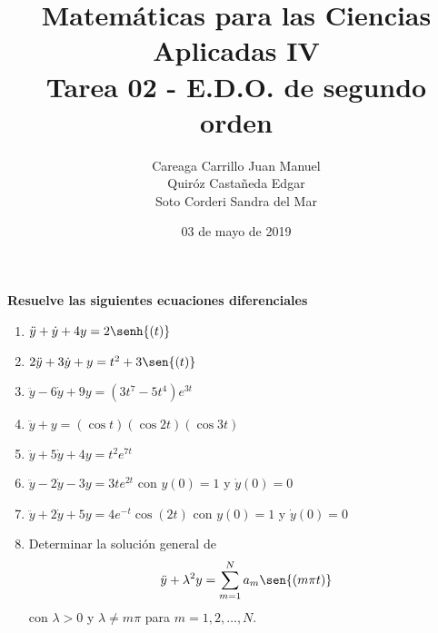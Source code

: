 \documentclass{article}
\title{
    Matemáticas para las Ciencias Aplicadas IV\\
    Tarea 02 - E.D.O. de segundo orden
}
\author{
    Careaga Carrillo Juan Manuel \\
    Quiróz Castañeda Edgar \\
    Soto Corderi Sandra del Mar
}
\date{
    03 de mayo de 2019
}
\begin{document}
    \maketitle
    {\bf Resuelve las siguientes ecuaciones diferenciales}
    \begin{enumerate}
        \item {
            $\ddot y+\dot y+4y=2\senh{(t)}$

            \color{azul}
        }
        \item {
            $2\ddot y+3\dot y+y=t^2+3\sen{(t)}$

            \color{azul}
        }
        \item {
            $\ddot y-6\dot y+9y=\left(3t^7-5t^4\right)e^{3t}$

            \color{azul}
        }
        \item {
            $\ddot y+y=(\cos{t})(\cos{2t})(\cos{3t})$

            \color{azul}
        }
        \item {
            $\ddot y+5\dot y+4y=t^2e^{7t}$

            \color{azul}
        }
        \item {
            $\ddot y-2\dot y-3y=3te^{2t}$ con $y(0)=1$ y $\dot y(0)=0$

            \color{azul}
        }
        \item {
            $\ddot y+2\dot y+5y=4e^{-t}\cos{(2t)}$ con $y(0)=1$ y $\dot y(0)=0$

            \color{azul}
        }
        \item {
            Determinar la solución general de
            $$\ddot{y}+\lambda^2y=\sum_{m=1}^{N}{a_m\sen{(m\pi t)}}$$
            con $\lambda>0$ y $\lambda\neq m\pi$ para $m=1,2,\ldots,N$.

            \color{azul}
        }
    \end{enumerate}
\end{document}
